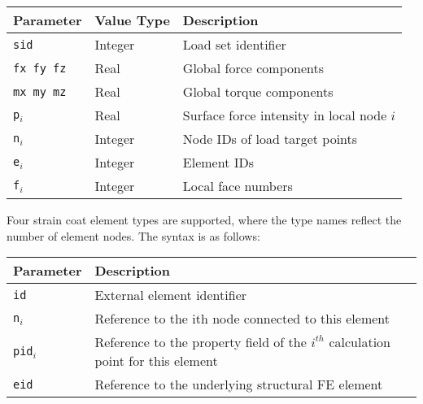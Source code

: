 
\medskip\noindent
\begin{tabular}{| m{} | m{} | m{} |}
  \hline
  \rowcolor[HTML]{EFEFEF}
  Parameter & Value Type & Description \\
  \hline\hline
  {\tt sid}   & Integer & Load set identifier \\
  \hline
  {\tt fx fy fz} & Real & Global force components \\
  \hline
  {\tt mx my mz} & Real & Global torque components \\
  \hline
  {\tt p$_i$} & Real    & Surface force intensity in local node $i$ \\
  \hline
  {\tt n$_i$} & Integer & Node IDs of load target points \\
  \hline
  {\tt e$_i$} & Integer & Element IDs \\
  \hline
  {\tt f$_i$} & Integer & Local face numbers \\
  \hline
\end{tabular}



Four strain coat element types are supported, where the type names
reflect the number of element nodes. The  syntax is as follows:


\medskip\noindent
\begin{tabular}{| m{} | m{} |}
  \hline
  \rowcolor[HTML]{EFEFEF}
  Parameter & Description \\
  \hline\hline
  {\tt id}  & External element identifier \\
  \hline
  {\tt n$_i$} & Reference to the ith node connected to this element \\
  \hline
  {\tt pid$_i$} & Reference to the property field of the $i^{th}$
                  calculation point for this element \\
  \hline
  {\tt eid} & Reference to the underlying structural FE element \\
  \hline
\end{tabular}


